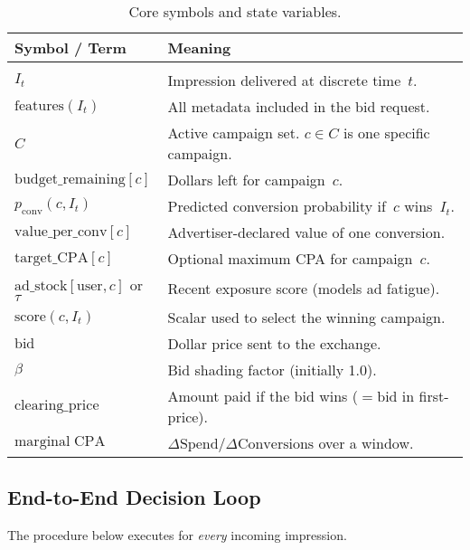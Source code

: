 \documentclass[11pt]{article}
\begin{document}
\begin{table}[H]
  \centering
  \caption{Core symbols and state variables.}
  \label{tab:variables}
  \begin{tabular}{ll}
    \hline
    Symbol / Term & Meaning \\
    \hline \\
    $I_t$ & Impression delivered at discrete time~$t$. \\
    $\mathrm{features}(I_t)$ & All metadata included in the bid request. \\
    $C$ & Active campaign set. $c \in C$ is one specific campaign. \\
    $\mathrm{budget\_remaining}[c]$ & Dollars left for campaign~$c$. \\
    $p_{\mathrm{conv}}(c,I_t)$ & Predicted conversion probability
    if~$c$ wins~$I_t$. \\
    $\mathrm{value\_per\_conv}[c]$ & Advertiser-declared value of one
    conversion. \\
    $\mathrm{target\_CPA}[c]$ & Optional maximum CPA for campaign~$c$. \\
    $\mathrm{ad\_stock}[\text{user},c]$ or $\tau$ & Recent exposure score
    (models ad fatigue). \\
    $\mathrm{score}(c,I_t)$ & Scalar used to select the winning campaign. \\
    $\mathrm{bid}$ & Dollar price sent to the exchange. \\
    $\beta$ & Bid shading factor (initially 1.0). \\
    $\mathrm{clearing\_price}$ & Amount paid if the bid wins
    ($=\mathrm{bid}$ in first-price). \\
    $\mathrm{marginal\;CPA}$ & $\Delta\text{Spend} /
    \Delta\text{Conversions}$ over a window.\\ 
  \end{tabular}
\end{table}

\subsection{End-to-End Decision Loop}\label{sec:decisionloop}
The procedure below executes for \emph{every} incoming impression.
\end{document}
